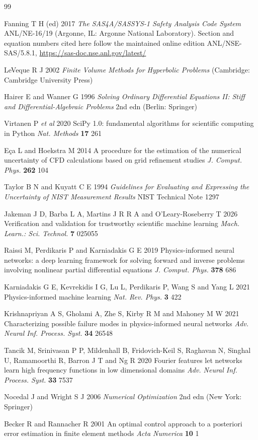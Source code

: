 \documentclass[11pt,a4paper]{article}
\begin{document}
\begin{thebibliography}{99}

 Fanning T H (ed) 2017 \emph{The SAS4A/SASSYS-1 Safety Analysis Code System}
ANL/NE-16/19 (Argonne, IL: Argonne National Laboratory). Section and equation numbers cited
here follow the maintained online edition ANL/NSE-SAS/5.8.1,
\url{https://sas-doc.nse.anl.gov/latest/}

 LeVeque R J 2002 \emph{Finite Volume Methods for Hyperbolic Problems}
(Cambridge: Cambridge University Press)

 Hairer E and Wanner G 1996 \emph{Solving Ordinary Differential Equations
II: Stiff and Differential-Algebraic Problems} 2nd edn (Berlin: Springer)

 Virtanen P \emph{et al} 2020 SciPy 1.0: fundamental algorithms for
scientific computing in Python \emph{Nat. Methods} \textbf{17} 261

 E\c{c}a L and Hoekstra M 2014 A procedure for the estimation of the numerical
uncertainty of CFD calculations based on grid refinement studies
\emph{J. Comput. Phys.} \textbf{262} 104

 Taylor B N and Kuyatt C E 1994 \emph{Guidelines for Evaluating and Expressing
the Uncertainty of NIST Measurement Results} NIST Technical Note 1297

 Jakeman J D, Barba L A, Martins J R R A and O'Leary-Roseberry T 2026
Verification and validation for trustworthy scientific machine learning
\emph{Mach. Learn.: Sci. Technol.} \textbf{7} 025055

 Raissi M, Perdikaris P and Karniadakis G E 2019 Physics-informed neural
networks: a deep learning framework for solving forward and inverse problems involving
nonlinear partial differential equations \emph{J. Comput. Phys.} \textbf{378} 686

 Karniadakis G E, Kevrekidis I G, Lu L, Perdikaris P, Wang S and Yang L
2021 Physics-informed machine learning \emph{Nat. Rev. Phys.} \textbf{3} 422

 Krishnapriyan A S, Gholami A, Zhe S, Kirby R M and Mahoney M W 2021
Characterizing possible failure modes in physics-informed neural networks
\emph{Adv. Neural Inf. Process. Syst.} \textbf{34} 26548

 Tancik M, Srinivasan P P, Mildenhall B, Fridovich-Keil S, Raghavan N,
Singhal U, Ramamoorthi R, Barron J T and Ng R 2020 Fourier features let networks learn high
frequency functions in low dimensional domains \emph{Adv. Neural Inf. Process. Syst.}
\textbf{33} 7537

 Nocedal J and Wright S J 2006 \emph{Numerical Optimization} 2nd edn
(New York: Springer)

 Becker R and Rannacher R 2001 An optimal control approach to a posteriori
error estimation in finite element methods \emph{Acta Numerica} \textbf{10} 1

\end{thebibliography}
\end{document}
